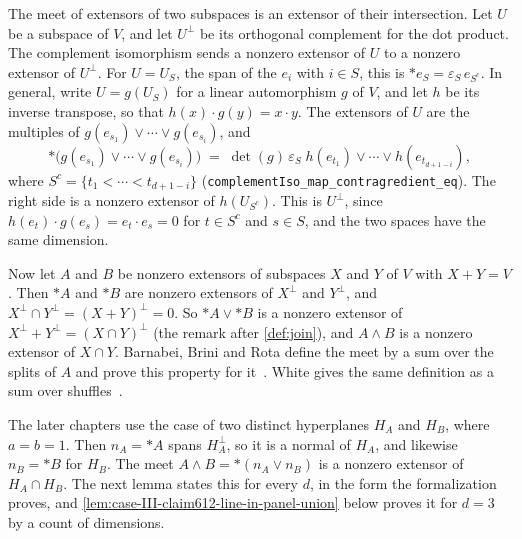 The meet of extensors of two subspaces is an extensor of their
intersection. Let $U$ be a subspace of $V$, and let $U^\perp$ be its
orthogonal complement for the dot product. The complement isomorphism
sends a nonzero extensor of $U$ to a nonzero extensor of $U^\perp$. For
$U = U_S$, the span of the $e_i$ with $i \in S$, this is
$*e_S = \varepsilon_S\, e_{S^c}$. In general, write $U = g(U_S)$ for a
linear automorphism $g$ of $V$, and let $h$ be its inverse transpose, so
that $h(x) \cdot g(y) = x \cdot y$. The extensors of $U$ are the
multiples of $g(e_{s_1}) \vee \cdots \vee g(e_{s_i})$, and
\[
  *\bigl(g(e_{s_1}) \vee \cdots \vee g(e_{s_i})\bigr)
  \;=\; \det(g)\, \varepsilon_S\;
  h(e_{t_1}) \vee \cdots \vee h(e_{t_{d+1-i}}),
\]
where $S^c = \{t_1 < \cdots < t_{d+1-i}\}$
(\texttt{complementIso\_\allowbreak{}map\_\allowbreak{}contragredient\_\allowbreak{}eq}).
The right side is a nonzero extensor of $h(U_{S^c})$. This is $U^\perp$,
since $h(e_t) \cdot g(e_s) = e_t \cdot e_s = 0$ for $t \in S^c$ and
$s \in S$, and the two spaces have the same dimension.

Now let $A$ and $B$ be nonzero extensors of subspaces $X$ and $Y$ of $V$
with $X + Y = V$. Then ${*A}$ and ${*B}$ are nonzero extensors of
$X^\perp$ and $Y^\perp$, and $X^\perp \cap Y^\perp = (X + Y)^\perp = 0$.
So ${*A} \vee {*B}$ is a nonzero extensor of
$X^\perp + Y^\perp = (X \cap Y)^\perp$ (the remark after \cref{def:join}),
and $A \wedge B$ is a nonzero extensor of $X \cap Y$. Barnabei, Brini and
Rota define the meet by a sum over the splits of $A$ and prove this
property for it~\cite[\S4, Proposition~4.3]{barnabeiBriniRota1985}.
White gives the same definition as a sum over
shuffles~\cite[\S4]{white1994}.

The later chapters use the case of two distinct hyperplanes $H_A$ and
$H_B$, where $a = b = 1$. Then $n_A = {*A}$ spans $H_A^\perp$, so it is a
normal of $H_A$, and likewise $n_B = {*B}$ for $H_B$. The meet
$A \wedge B = *(n_A \vee n_B)$ is a nonzero extensor of $H_A \cap H_B$.
The next lemma states this for every $d$, in the form the formalization
proves, and \cref{lem:case-III-claim612-line-in-panel-union} below
proves it for $d = 3$ by a count of dimensions.

